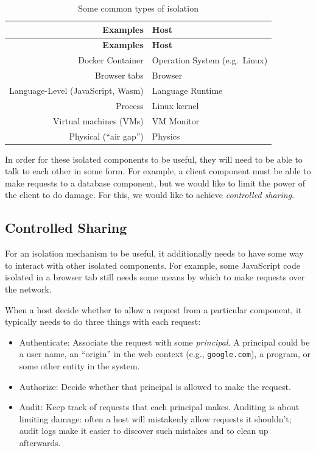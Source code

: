 \documentclass[
  letterpaper,
]{scrbook}
\providecommand{\tightlist}{%
  \setlength{\itemsep}{0pt}\setlength{\parskip}{0pt}}
\theoremstyle{definition}
\theoremstyle{plain}
\theoremstyle{plain}
\theoremstyle{remark}
\begin{document}
\begin{longtable}[]{@{}rl@{}}
\caption{Some common types of
isolation}\label{tbl-isolationtypes}\tabularnewline
\toprule\noalign{}
\textbf{Examples} & \textbf{Host} \\
\midrule\noalign{}
\endfirsthead
\toprule\noalign{}
\textbf{Examples} & \textbf{Host} \\
\midrule\noalign{}
\endhead
\bottomrule\noalign{}
\endlastfoot
Docker Container & Operation System (e.g.~Linux) \\
Browser tabs & Browser \\
Language-Level (JavaScript, Wasm) & Language Runtime \\
Process & Linux kernel \\
Virtual machines (VMs) & VM Monitor \\
Physical (``air gap'') & Physics \\
\end{longtable}

In order for these isolated components to be useful, they will need to
be able to talk to each other in some form. For example, a client
component must be able to make requests to a database component, but we
would like to limit the power of the client to do damage. For this, we
would like to achieve \emph{controlled sharing}.

\subsection{Controlled Sharing}\label{controlled-sharing}

For an isolation mechanism to be useful, it additionally needs to have
some way to interact with other isolated components. For example, some
JavaScript code isolated in a browser tab still needs some means by
which to make requests over the network.

When a host decide whether to allow a request from a particular
component, it typically needs to do three things with each request:


\begin{itemize}
\tightlist
\item
  Authenticate: Associate the request with some \emph{principal}. A
  principal could be a user name, an ``origin'' in the web context
  (e.g., \texttt{google.com}), a program, or some other entity in the
  system.
\item
  Authorize: Decide whether that principal is allowed to make the
  request.
\item
  Audit: Keep track of requests that each principal makes. Auditing is
  about limiting damage: often a host will mistakenly allow requests it
  shouldn't; audit logs make it easier to discover such mistakes and to
  clean up afterwards.
\end{itemize}
\end{document}
